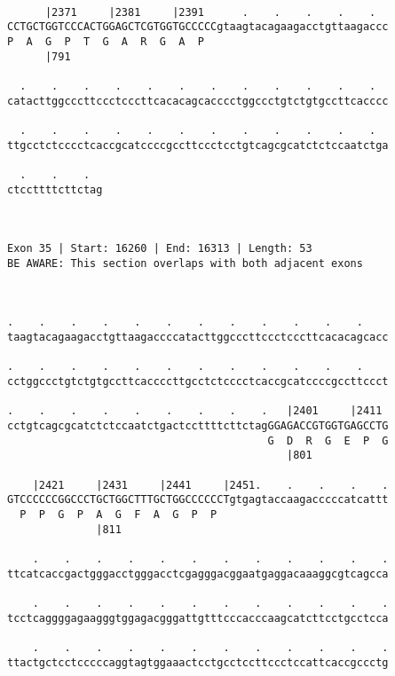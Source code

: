 \documentclass{article}
\begin{document}
\begin{Verbatim}
  
      |2371     |2381     |2391      .    .    .    .    .  
CCTGCTGGTCCCACTGGAGCTCGTGGTGCCCCCgtaagtacagaagacctgttaagaccc
P  A  G  P  T  G  A  R  G  A  P                             
      |791                                                  
  
  .    .    .    .    .    .    .    .    .    .    .    .  
catacttggcccttccctcccttcacacagcacccctggccctgtctgtgccttcacccc
                                                            
  .    .    .    .    .    .    .    .    .    .    .    .  
ttgcctctcccctcaccgcatccccgccttccctcctgtcagcgcatctctccaatctga
                                                            
  .    .    .  
ctccttttcttctag
               
               
 
Exon 35 | Start: 16260 | End: 16313 | Length: 53
BE AWARE: This section overlaps with both adjacent exons



.    .    .    .    .    .    .    .    .    .    .    .    
taagtacagaagacctgttaagaccccatacttggcccttccctcccttcacacagcacc
                                                            
.    .    .    .    .    .    .    .    .    .    .    .    
cctggccctgtctgtgccttcaccccttgcctctcccctcaccgcatccccgccttccct
                                                            
.    .    .    .    .    .    .    .    .   |2401     |2411 
cctgtcagcgcatctctccaatctgactccttttcttctagGGAGACCGTGGTGAGCCTG
                                         G  D  R  G  E  P  G
                                            |801            
  
    |2421     |2431     |2441     |2451.    .    .    .    .
GTCCCCCCGGCCCTGCTGGCTTTGCTGGCCCCCCTgtgagtaccaagacccccatcattt
  P  P  G  P  A  G  F  A  G  P  P                           
              |811                                          
  
    .    .    .    .    .    .    .    .    .    .    .    .
ttcatcaccgactgggacctgggacctcgagggacggaatgaggacaaaggcgtcagcca
                                                            
    .    .    .    .    .    .    .    .    .    .    .    .
tcctcaggggagaagggtggagacgggattgtttcccacccaagcatcttcctgcctcca
                                                            
    .    .    .    .    .    .    .    .    .    .    .    .
ttactgctcctcccccaggtagtggaaactcctgcctccttccctccattcaccgccctg
                                                            

\end{Verbatim}
\end{document}
